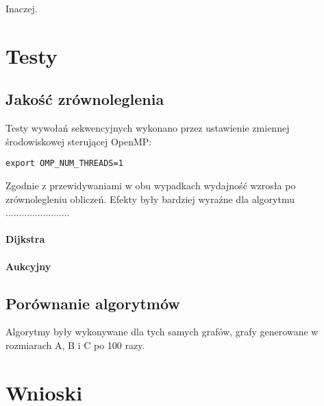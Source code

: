 \documentclass {article}
\begin{document}
Inaczej.

\section{Testy}

\subsection{Jakość zrównoleglenia}

Testy wywołań sekwencyjnych wykonano przez ustawienie zmiennej środowiskowej sterującej OpenMP:

\begin{verbatim}
export OMP_NUM_THREADS=1
\end{verbatim}

Zgodnie z przewidywaniami w obu wypadkach wydajność wzrosła po zrównolegleniu obliczeń. Efekty były bardziej wyraźne dla algorytmu ........................

\paragraph{Dijkstra}


\paragraph{Aukcyjny}



\subsection{Porównanie algorytmów}

Algorytmy były wykonywane dla tych samych grafów, grafy generowane w rozmiarach A, B i C po 100 razy.


\section{Wnioski}
\end{document}
